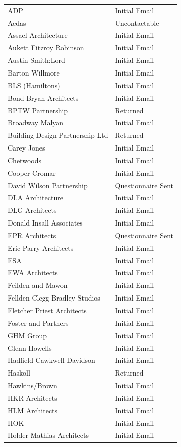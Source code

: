 \documentclass[table,a4paper,oneside]{book}
\begin{document}
\begin{longtable}{ll}
ADP & Initial Email \\
Aedas & Uncontactable \\
Assael Architecture & Initial Email \\
Aukett Fitzroy Robinson & Initial Email \\
Austin-Smith:Lord & Initial Email \\
Barton Willmore & Initial Email \\
BLS (Hamiltons) & Initial Email \\
Bond Bryan Architects & Initial Email \\
BPTW Partnership & Returned \\
Broadway Malyan &Initial Email \\
Building Design Partnership Ltd & Returned \\
Carey Jones & Initial Email \\
Chetwoods & Initial Email \\
Cooper Cromar & Initial Email \\
David Wilson Partnership & Questionnaire Sent \\
DLA Architecture & Initial Email \\
DLG Architects & Initial Email \\
Donald Insall Associates & Initial Email \\
EPR Architects & Questionnaire Sent \\
Eric Parry Architects & Initial Email \\
ESA & Initial Email \\
EWA Architects & Initial Email \\
Feilden and Mawon & Initial Email\\
Fellden Clegg Bradley Studios & Initial Email \\
Fletcher Priest Architects & Initial Email \\
Foster and Partners & Initial Email \\
GHM Group & Initial Email \\
Glenn Howells & Initial Email \\
Hadfield Cawkwell Davidson & Initial Email \\
Haskoll & Returned \\
Hawkins/Brown & Initial Email \\
HKR Architects &Initial Email \\
HLM Architects & Initial Email \\
HOK & Initial Email \\
Holder Mathias Architects & Initial Email \\

\end{longtable}
\end{document}
